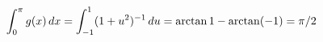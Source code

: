 \documentclass[preview]{standalone}
\begin{document}
\begin{align*}
\special{dvisvgm:raw <g id='unique000'>}\int_0^\pi g(x)\,dx=\int_{-1}^1(1+u^2)^{-1}\,du=\arctan1-\arctan(-1)=\pi/2\special{dvisvgm:raw </g>}
\end{align*}
\end{document}
